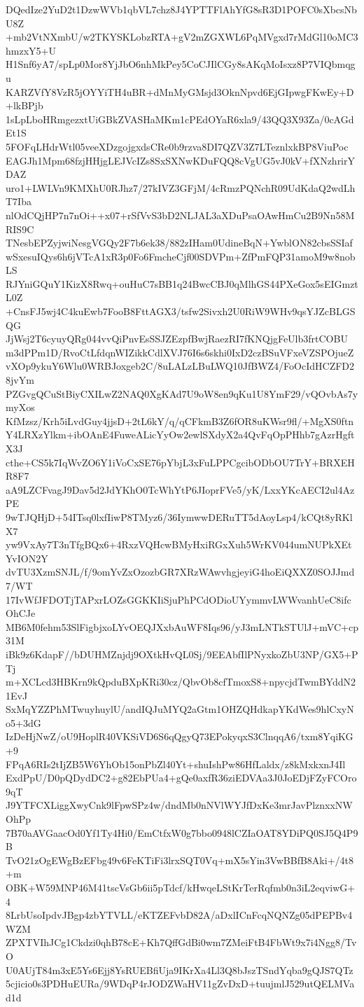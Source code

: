 DQedIze2YuD2t1DzwWVb1qbVL7chz8J4YPTTFlAhYfG8sR3D1POFC0sXbcsNbU8Z
+mb2VtNXmbU/w2TKYSKLobzRTA+gV2mZGXWL6PqMVgxd7rMdGl10oMC3hmzxY5+U
H1Snf6yA7/spLp0Mor8YjJbO6nhMkPey5CoCJIlCGy8sAKqMoIsxz8P7VIQbmqgu
KARZVfY8VzR5jOYYiTH4uBR+dMnMyGMsjd3OknNpvd6EjGIpwgFKwEy+D+lkBPjb
1sLpLboHRmgezxtUiGBkZVASHaMKm1cPEdOYaR6xla9/43QQ3X93Za/0cAGdEt1S
5FOFqLHdrWtl05veeXDzgojgxdsCRe0b9rzva8DI7QZV3Z7LTeznlxkBP8ViuPoc
EAGJh1Mpm68fzjHHjgLEJVcIZs8SxSXNwKDuFQQ8cVgUG5vJ0kV+fXNzhrirYDAZ
uro1+LWLVn9KMXhU0RJhz7/27kIVZ3GFjM/4cRmzPQNchR09UdKdaQ2wdLhT7Iba
nlOdCQjHP7n7nOi++x07+rSfVvS3bD2NLJAL3aXDuPsaOAwHmCu2B9Nn58MRIS9C
TNesbEPZyjwiNesgVGQy2F7b6ek38/882zIHam0UdineBqN+YwblON82cbsSSIaf
wSxesuIQys6h6jVTcA1xR3p0Fo6FmcheCjf00SDVPm+ZfPmFQP31amoM9w8nobLS
RJYniGQuY1KizX8Rwq+ouHuC7sBB1q24BwcCBJ0qMlhGS44PXeGox5sEIGmztL0Z
+CnsFJ5wj4C4kuEwb7FooB8FttAGX3/tsfw2Sivxh2U0RiW9WHv9qsYJZcBLGSQG
JjWsj2T6cyuyQRg044vvQiPnvEsSSJZEzpfBwjRaezRI7fKNQjgFeUlb3frtCOBU
m3dPPm1D/RvoCtLfdqnWIZikkCdlXVJ76I6s6skhi0IxD2czBSuVFxeVZSPOjueZ
vXOp9ykuY6Wlu0WRBJoxgeb2C/8uLALzLBuLWQ10JfBWZ4/FoOcIdHCZFD28jvYm
PZGvgQCuStBiyCXILwZ2NAQ0XgKAd7U9oW8en9qKu1U8YmF29/vQOvbAs7ymyXos
KfMzsz/Krh5iLvdGuy4jjsD+2tL6kY/q/qCFkmB3Z6fOR8uKWsr9fl/+MgXS0ftn
Y4LRXzYlkm+ibOAnE4FuweALicYyOw2ewlSXdyX2a4QvFqOpPHhb7gAzrHgftX3J
cthe+CS5k7IqWvZO6Y1iVoCxSE76pYbjL3xFuLPPCgcibODbOU7TrY+BRXEHR8F7
aA9LZCFvagJ9Dav5d2JdYKhO0TcWhYtP6JIoprFVe5/yK/LxxYKcAECI2ul4AzPE
9wTJQHjD+54ITsq0lxfIiwP8TMyz6/36IymwwDERuTT5dAoyLsp4/kCQt8yRKlX7
yw9VxAy7T3nTfgBQx6+4RxzVQHcwBMyHxiRGxXuh5WrKV044umNUPkXEtYvION2Y
dvTU3XzmSNJL/f/9omYvZxOzozbGR7XRzWAwvhgjeyiG4hoEiQXXZ0SOJJmd7/WT
17IvWfJFDOTjTAPxrLOZsGGKKIiSjuPhPCdODioUYymmvLWWvanhUeC8ifcOhCJe
MB6M0fehm53SlFigbjxoLYvOEQJXxbAuWF8Iqs96/yJ3mLNTkSTUlJ+mVC+cp31M
iBk9z6KdapF//bDUHMZnjdj9OXtkHvQL0Sj/9EEAbfIlPNyxkoZbU3NP/GX5+PTj
m+XCLcd3HBKrn9kQpduBXpKRi30cz/QbvOb8cfTmoxS8+npycjdTwmBYddN21EvJ
SxMqYZZPhMTwuyhuylU/andIQJuMYQ2aGtm1OHZQHdkapYKdWes9hlCxyNo5+3dG
IzDeHjNwZ/oU9HoplR40VKSiVD6S6qQgyQ73EPokyqxS3ClnqqA6/txm8YqiKG+9
FPqA6RIs2tIjZB5W6YhOb15onPbZl40Yt+shuIshPw86HfLaldx/z8kMxkxnJ4Il
ExdPpU/D0pQDydDC2+g82EbPUa4+gQe0axfR36ziEDVAa3J0JoEDjFZyFCOro9qT
J9YTFCXLiggXwyCnk9lFpwSPz4w/dndMb0nNVlWYJfDxKe3mrJavPlznxxNWOhPp
7B70aAVGaacOd0Yf1Ty4Hi0/EmCtfxW0g7bbo0948lCZIaOAT8YDiPQ0SJ5Q4P9B
TvO21zOgEWgBzEFbg49v6FeKTiFi3lrxSQT0Vq+mX5sYin3VwBBfB8Aki+/4t8+m
OBK+W59MNP46M41tscVsGb6ii5pTdcf/kHwqeLStKrTerRqfmb0n3iL2eqviwG+4
8LrbUsoIpdvJBgp4zbYTVLL/eKTZEFvbD82A/aDxlICnFcqNQNZg05dPEPBv4WZM
ZPXTVIhJCg1Ckdzi0qhB78cE+Kh7QffGdBi0wm7ZMeiFtB4FbWt9x7i4Ngg8/TvO
U0AUjT84m3xE5Ys6Ejj8YsRUEBfiUja9IKrXa4Ll3Q8bJszTSndYqba9gQJS7QTz
5cjicio0s3PDHuEURa/9WDqP4rJODZWaHV11gZvDxD+tuujmlJ529utQELMVad1d
